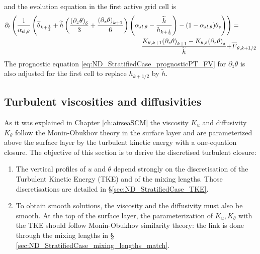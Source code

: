 and the evolution equation in the first active grid cell is
\begin{equation}
    \begin{aligned}
	\label{eq:ND_StratifiedCase_semiDiscreteEkmanEqPTFVfree}
	    \partial_t \left(\frac{1}{\alpha_{\rm sl, \theta}}
	    \left(
	    \overline{\theta}_{k+\frac{1}{2}} +
	\widetilde{h}\left(\frac{{(\partial_z \theta)}_\delta}{3} +
	\frac{{(\partial_z \theta)}_{k+1}}{6}\right)
		\left(\alpha_{sl, \theta} -
	    	\frac{\widetilde{h}}{h_{k+\frac{1}{2}}}\right)
	 - (1 - \alpha_{sl, \theta})\theta_s
	    \right) \right)&
	= \\
	    \frac{K_{\theta, k+1}{(\partial_z \theta)}_{k+1} -
	K_{\theta,\delta} {(\partial_z \theta)}_\delta}{\widetilde{h}}
	    + &\overline{F}_{\theta, k+1/2}
    \end{aligned}
\end{equation}
The prognostic equation \eqref{eq:ND_StratifiedCase_prognosticPT_FV}
for $\partial_z \theta$ is also adjusted for the first
cell to replace $h_{k+1/2}$ by $\widetilde{h}$.
\subsection{Turbulent viscosities and diffusivities}
\label{sec:ND_StratifiedCase_turbulentVisc}
As it was explained in Chapter \ref{ch:airseaSCM} the
viscosity $K_u$ and diffusivity $K_\theta$ follow the
Monin-Obukhov theory in the surface layer and are parameterized
above the surface layer by the turbulent kinetic energy with a
one-equation closure.
The objective of this section is to derive the discretised
turbulent closure:
\begin{enumerate}
\item
The vertical profiles of $u$ and $\theta$ depend strongly on
the discretisation of the Turbulent Kinetic Energy (TKE)
and of the mixing lengths. Those discretisations are detailed in
\S \ref{sec:ND_StratifiedCase_TKE}.
\item To obtain smooth solutions, the viscosity and
the diffusivity must also be smooth.
At the top of the surface layer, the parameterization
of $K_u, K_\theta$ with the TKE should follow Monin-Obukhov
similarity theory:
the link is done through the mixing lengths in \S
\ref{sec:ND_StratifiedCase_mixing_lengths_match}.
\end{enumerate}
